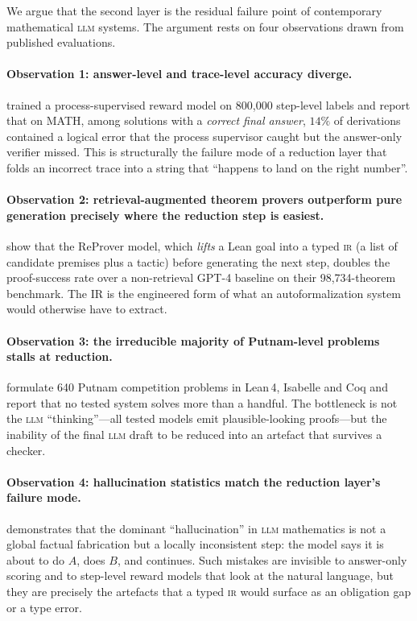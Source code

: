 \documentclass[11pt,a4paper]{article}
\newcommand{\LLM}{\textsc{llm}}
\newcommand{\IR}{\textsc{ir}}
\newcommand{\Coq}{Coq}
\newcommand{\Lean}{Lean}
\newcommand{\LeanFour}{Lean\,4}
\begin{document}
We argue that the second layer is the residual failure point of
contemporary mathematical \LLM{} systems.  The argument rests on
four observations drawn from published evaluations.

\paragraph{Observation 1: answer-level and trace-level accuracy
diverge.}  \citet{lightman2023letsverify} trained a
process-supervised reward model on 800{,}000 step-level labels and
report that on MATH, among solutions with a \emph{correct final
answer}, $14\%$ of derivations contained a logical error that the
process supervisor caught but the answer-only verifier missed.
This is structurally the failure mode of a reduction layer that
folds an incorrect trace into a string that ``happens to land on
the right number''.

\paragraph{Observation 2: retrieval-augmented theorem provers
outperform pure generation precisely where the reduction step is
easiest.}  \citet{yang2023leandojo} show that the ReProver model,
which \emph{lifts} a \Lean{} goal into a typed \IR{} (a list of
candidate premises plus a tactic) before generating the next step,
doubles the proof-success rate over a non-retrieval
GPT-4 baseline on their 98{,}734-theorem benchmark.  The IR is the
engineered form of what an autoformalization system would otherwise
have to extract.

\paragraph{Observation 3: the irreducible majority of Putnam-level
problems stalls at reduction.}  \citet{tsoukalas2024putnambench}
formulate 640 Putnam competition problems in \LeanFour{}, Isabelle
and \Coq{} and report that no tested system solves more than a
handful.  The bottleneck is not the \LLM{} ``thinking''---all
tested models emit plausible-looking proofs---but the inability of
the final \LLM{} draft to be reduced into an artefact that survives
a checker.

\paragraph{Observation 4: hallucination statistics match the
reduction layer's failure mode.}
\citet{manakul2023selfcheckgpt} demonstrates that the dominant
``hallucination'' in \LLM{} mathematics is not a global factual
fabrication but a locally inconsistent step: the model says it is
about to do $A$, does $B$, and continues.  Such mistakes are
invisible to answer-only scoring and to step-level reward models
that look at the natural language, but they are precisely the
artefacts that a typed \IR{} would surface as an obligation gap or a
type error.
\end{document}
